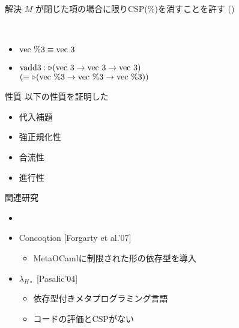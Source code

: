 \documentclass[dvipdfmx,aspectratio=169, 20pt]{beamer}
\renewcommand{\V}{\vdash}
\begin{document}
\begin{frame}[fragile]{解決}
    \newcommand{\Vt}{\text{vec}\ 3}
    \newcommand{\Vpt}{\text{vec}\ \%3}
    \( M \) が閉じた項の場合に限りCSP(\%)を消すことを許す (\QPercent)
    {\footnotesize{
    \begin{center}
         \\[2mm]
        \infrule[{\TConv}]{
            \G\V M:\tau@n \andalso
            \G\V \tau\equiv \sigma @n
        }{
            \G\V M:\sigma@n
        }
    \end{center}
    }}
    \begin{exampleblock}{}
        \begin{itemize}
            \item \( \text{vec}\ \%3 \equiv \text{vec}\ 3 \)
            \item \( \text{vadd3} : \TW (\Vt \to \Vt \to \Vt) \) \\
                \hspace{15mm} \( (\E  \TW (\Vpt \to \Vpt \to \Vpt)) \)
        \end{itemize}
    \end{exampleblock}
\end{frame}

\begin{frame}[fragile]{性質}
    以下の性質を証明した
    \begin{itemize}
        \item 代入補題
        \item 強正規化性
        \item 合流性
        \item 進行性
    \end{itemize}
\end{frame}

\begin{frame}[fragile]{関連研究}
    \begin{itemize}
        \item {}
        \item Concoqtion [Forgarty et al.'07]
            \begin{itemize}
                \item MetaOCamlに制限された形の依存型を導入
            \end{itemize}
        \item \( \lambda_{H\circ} \) [Pasalic'04]
            \begin{itemize}
                \item 依存型付きメタプログラミング言語
                \item コードの評価とCSPがない
            \end{itemize}
    \end{itemize}
\end{frame}
\end{document}
